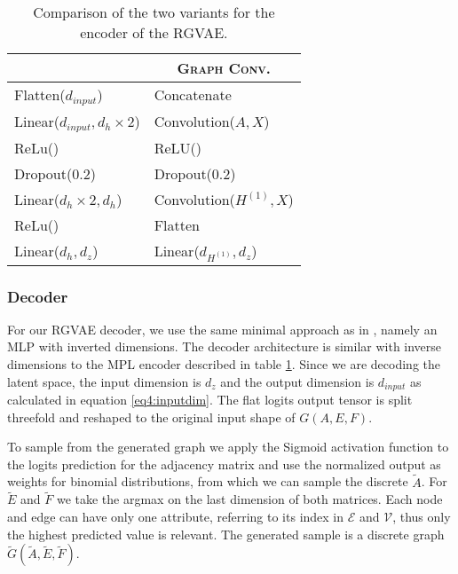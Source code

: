 \begin{table}[H]
    \centering
        \begin{tabular}{|l|l|}
        \hline
        \rowcolor[HTML]{EFEFEF}
        \multicolumn{1}{|c}{\textsc{MLP}} & \multicolumn{1}{c}{\textsc{Graph Conv.}} \\\hline
        Flatten($d_{input}$) &   Concatenate \\
        Linear($d_{input},d_{h}\times 2$) &   Convolution($A,X$) \\
        ReLu() &   ReLU() \\   
        Dropout($0.2$) &   Dropout($0.2$) \\
        Linear($d_{h}\times 2,d_{h}$) &   Convolution($H^{(1)},X$) \\
        ReLu() &   Flatten \\
        Linear($d_{h},d_{z}$) &   Linear($d_{H^{(1)}},d_z$) \\
        \hline
        \end{tabular}
        \caption{Comparison of the two variants for the encoder of the RGVAE.}
        \label{tab4:archcompare}
    \end{table}

\subsubsection{Decoder}


For our RGVAE decoder, we use the same minimal approach as in \cite{simonovsky_graphvae_2018}, namely an MLP with inverted dimensions. The decoder architecture is similar with inverse dimensions to the MPL encoder described in table \ref{tab4:archcompare}. Since we are decoding the latent space, the input dimension is $d_z$ and the output dimension is $d_{input}$ as calculated in equation \ref{eq4:inputdim}. The flat logits output tensor is split threefold and reshaped to the original input shape of $G(A,E,F)$.   



To sample from the generated graph we apply the Sigmoid activation function to the logits prediction for the adjacency matrix and use the normalized output as weights for binomial distributions, from which we can sample the discrete $\tilde{A}$. For $\tilde{E}$ and $\tilde{F}$ we take the argmax on the last dimension of both matrices. Each node and edge can have only one attribute, referring to its index in $\mathcal{E}$ and $\mathcal{V}$, thus only the highest predicted value is relevant. The generated sample is a discrete graph $\tilde{G}(\tilde{A},\tilde{E},\tilde{F})$.



